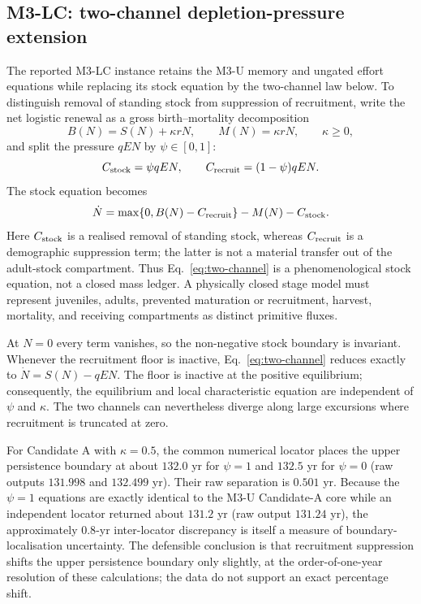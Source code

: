 \documentclass[11pt]{article}
\begin{document}
\subsection{M3-LC: two-channel depletion-pressure extension}

The reported M3-LC instance retains the M3-U memory and ungated effort equations while replacing its stock equation by the two-channel law below. To distinguish removal of standing stock from suppression of recruitment, write the net logistic renewal as a gross birth--mortality decomposition
\[
B(N)=S(N)+\kappa rN,
\qquad
M(N)=\kappa rN,
\qquad \kappa\ge0,
\]
and split the pressure $qEN$ by $\psi\in[0,1]$:
\[
C_{\rm stock}=\psi qEN,
\qquad
C_{\rm recruit}=(1-\psi)qEN.
\]
The stock equation becomes
\begin{equation}
\dot N=\max\{0,B(N)-C_{\rm recruit}\}-M(N)-C_{\rm stock}.
\label{eq:two-channel}
\end{equation}
Here $C_{\rm stock}$ is a realised removal of standing stock, whereas $C_{\rm recruit}$ is a demographic suppression term; the latter is not a material transfer out of the adult-stock compartment. Thus Eq.~\eqref{eq:two-channel} is a phenomenological stock equation, not a closed mass ledger. A physically closed stage model must represent juveniles, adults, prevented maturation or recruitment, harvest, mortality, and receiving compartments as distinct primitive fluxes.

At $N=0$ every term vanishes, so the non-negative stock boundary is invariant. Whenever the recruitment floor is inactive, Eq.~\eqref{eq:two-channel} reduces exactly to $\dot N=S(N)-qEN$. The floor is inactive at the positive equilibrium; consequently, the equilibrium and local characteristic equation are independent of $\psi$ and $\kappa$. The two channels can nevertheless diverge along large excursions where recruitment is truncated at zero.

For Candidate A with $\kappa=0.5$, the common numerical locator places the upper persistence boundary at about $132.0$ yr for $\psi=1$ and $132.5$ yr for $\psi=0$ (raw outputs $131.998$ and $132.499$ yr). Their raw separation is $0.501$ yr. Because the $\psi=1$ equations are exactly identical to the M3-U Candidate-A core while an independent locator returned about $131.2$ yr (raw output $131.24$ yr), the approximately $0.8$-yr inter-locator discrepancy is itself a measure of boundary-localisation uncertainty. The defensible conclusion is that recruitment suppression shifts the upper persistence boundary only slightly, at the order-of-one-year resolution of these calculations; the data do not support an exact percentage shift.
\end{document}
